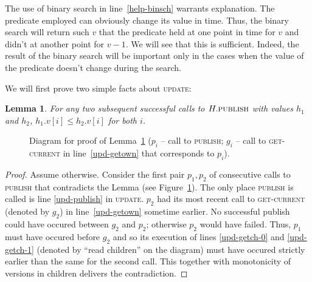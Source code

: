 \documentclass[a4paper,11pt]{article}
\newcommand{\atomic}[4]{\node(lab#1) at (#3,-#4+0.5) {#2};\draw (#3,-#4-0.1) to (lab#1);\node[inner sep=0pt](#1) at (#3,-#4) {};}
\newtheorem{lemma}{Lemma}
\newcommand{\fn}[1]{\textsc{#1}}
\begin{document}
The use of binary search in line~\ref{help-binsch} warrants explanation. The predicate employed can obviously change its value in time. Thus, the binary search will return such $v$ that the predicate held at one point in time
for $v$ and didn't at another point for $v-1$. We will see that this is sufficient. Indeed, the result of the binary search will be important only in the cases when the value of the predicate doesn't change during
the search.

We will first prove two simple facts about \fn{update}:

\begin{lemma}
\label{lem-versions-increase}
For any two subsequent successful calls to $H.\fn{publish}$ with values $h_1$ and $h_2$, $h_1.v[i] \leq h_2.v[i]$ for both $i$.
\end{lemma}
\begin{figure}[!h]
\caption{Diagram for proof of Lemma~\ref{lem-versions-increase} ($p_i$ -- call to \fn{publish}; $g_i$ -- call to \fn{get-current} in line~\ref{upd-getown} that corresponds to $p_i$).}
\label{fig-versions-increase}
\end{figure}
\begin{proof}
Assume otherwise. Consider the first pair $p_1, p_2$ of consecutive calls to \fn{publish} that contradicts the Lemma (see Figure~\ref{fig-versions-increase}). The only place \fn{publish} is called is line \ref{upd-publish}
in \fn{update}.
$p_2$ had its most recent call to \fn{get-current} (denoted by $g_2$) in line~\ref{upd-getown} sometime earlier. No successful publish could have occured between $g_2$ and $p_2$; otherwise $p_2$
would have failed.
Thus, $p_1$ must have occured before $g_2$ and so its execution of lines \ref{upd-getch-0} and \ref{upd-getch-1} (denoted by ``read children'' on the diagram) must have occured strictly earlier than
the same for the second call. This together with monotonicity of versions in children delivers the contradiction.
\end{proof}
\end{document}
